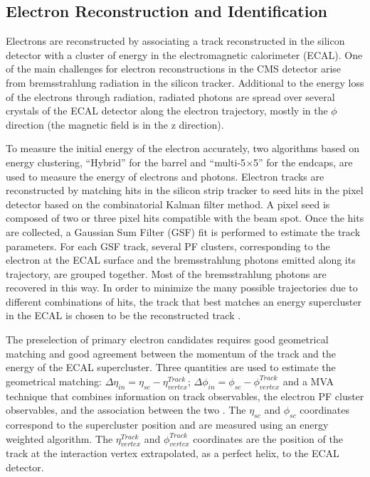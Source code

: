 \subsection{Electron Reconstruction and Identification}\label{eID}

Electrons are reconstructed by associating a track reconstructed in the silicon detector with a 
cluster of energy in the electromagnetic calorimeter (ECAL). One of the main challenges for electron 
reconstructions in the CMS detector arise from bremsstrahlung radiation in the silicon tracker. 
Additional to the energy loss of the electrons through radiation, radiated photons are spread  over 
several crystals of the ECAL detector along the electron trajectory, mostly in the $\phi$ direction  
(the magnetic field is in the z direction). 


To measure the initial energy of the electron accurately, two algorithms  based on energy clustering, 
``Hybrid'' for the barrel and  ``multi-5$\times$5'' for the endcaps, are used to measure the energy of 
electrons and photons. Electron tracks are reconstructed by matching hits in the silicon 
strip tracker to seed hits in the pixel  detector based on the combinatorial Kalman filter method. 
A pixel seed is composed of two or three pixel hits compatible with the beam spot. Once the hits are 
collected, a Gaussian Sum Filter (GSF) fit is performed to estimate the track parameters. For each GSF 
track, several PF clusters, corresponding to the electron at the ECAL surface and the bremsstrahlung 
photons emitted along its trajectory, are grouped together. Most of the bremsstrahlung photons are 
recovered in this way. In order to minimize the many possible trajectories due to different 
combinations of hits, the  track that best matches an energy supercluster in the ECAL is chosen to 
be the reconstructed track \cite{electron8TeV}.

The preselection of primary electron candidates requires  good geometrical matching and good
agreement between the  momentum of the track and the energy of the ECAL  supercluster. Three
quantities are used to estimate the geometrical matching: $\Delta \eta_{in} = \eta_{sc}
-\eta^{Track}_{vertex}$;  $\Delta \phi_{in} = \phi_{sc} -\phi^{Track}_{vertex}$ and a MVA technique 
that combines information on track observables, the electron PF cluster observables, and the 
association between the two . The $\eta_{sc}$ and $\phi_{sc}$ coordinates correspond to  the 
supercluster position and are measured using an energy weighted algorithm. The $\eta^{Track}_{vertex}$ 
and  $\phi^{Track}_{vertex}$ coordinates are the position of the track at the interaction vertex 
extrapolated,  as a perfect helix, to the ECAL detector. 

